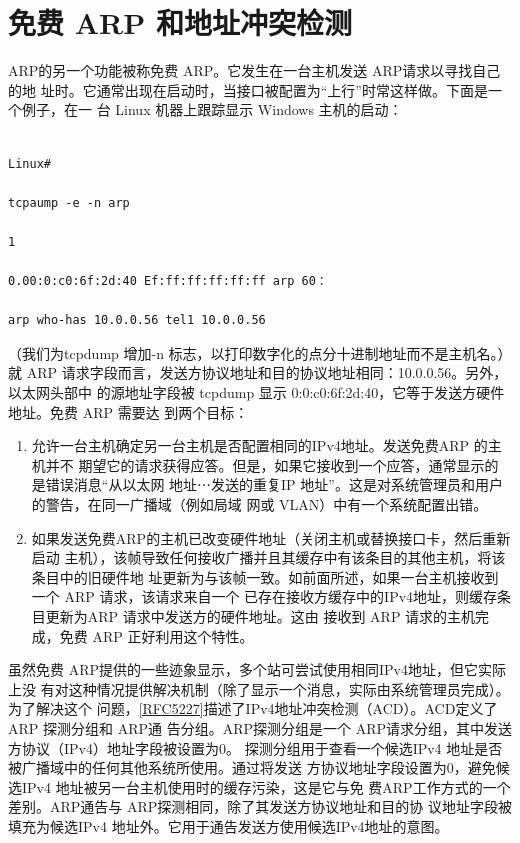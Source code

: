 \section{免费 ARP 和地址冲突检测}

ARP的另一个功能被称免费 ARP。它发生在一台主机发送 ARP请求以寻找自己的地
址时。它通常出现在启动时，当接口被配置为“上行”时常这样做。下面是一个例子，在一
台 Linux 机器上跟踪显示 Windows 主机的启动：

\begin{verbatim}
    
Linux#

tcpaump -e -n arp

1

0.00:0:c0:6f:2d:40 Ef:ff:ff:ff:ff:ff arp 60：

arp who-has 10.0.0.56 tel1 10.0.0.56
\end{verbatim}

（我们为tcpdump 增加-n 标志，以打印数字化的点分十进制地址而不是主机名。）就
ARP 请求字段而言，发送方协议地址和目的协议地址相同：10.0.0.56。另外，以太网头部中
的源地址字段被 tcpdump 显示 0:0:c0:6f:2d:40，它等于发送方硬件地址。免费 ARP 需要达
到两个目标：

\begin{enumerate}
    \item 允许一台主机确定另一台主机是否配置相同的IPv4地址。发送免费ARP 的主机并不
    期望它的请求获得应答。但是，如果它接收到一个应答，通常显示的是错误消息“从以太网
    地址⋯发送的重复IP 地址”。这是对系统管理员和用户的警告，在同一广播域（例如局域
    网或 VLAN）中有一个系统配置出错。
    
    \item 如果发送免费ARP的主机已改变硬件地址（关闭主机或替换接口卡，然后重新启动
    主机），该帧导致任何接收广播并且其缓存中有该条目的其他主机，将该条目中的旧硬件地
    址更新为与该帧一致。如前面所述，如果一台主机接收到一个 ARP 请求，该请求来自一个
    已存在接收方缓存中的IPv4地址，则缓存条目更新为ARP 请求中发送方的硬件地址。这由
    接收到 ARP 请求的主机完成，免费 ARP 正好利用这个特性。
\end{enumerate}

虽然免费 ARP提供的一些迹象显示，多个站可尝试使用相同IPv4地址，但它实际上没
有对这种情况提供解决机制（除了显示一个消息，实际由系统管理员完成）。为了解决这个
问题，\href{https://www.rfc-editor.org/rfc/rfc5227}{[RFC5227]}描述了IPv4地址冲突检测（ACD）。ACD定义了 ARP 探测分组和 ARP通
告分组。ARP探测分组是一个 ARP请求分组，其中发送方协议（IPv4）地址字段被设置为0。
探测分组用于查看一个候选IPv4 地址是否被广播域中的任何其他系统所使用。通过将发送
方协议地址字段设置为0，避免候选IPv4 地址被另一台主机使用时的缓存污染，这是它与免
费ARP工作方式的一个差别。ARP通告与 ARP探测相同，除了其发送方协议地址和目的协
议地址字段被填充为候选IPv4 地址外。它用于通告发送方使用候选IPv4地址的意图。

